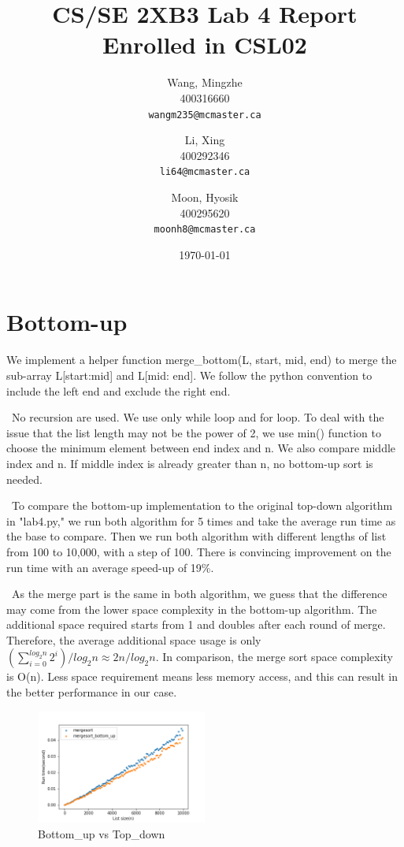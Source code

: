 \documentclass[12pt]{article}
\title{CS/SE 2XB3 Lab 4 Report\\Enrolled in CSL02}
\author{
  Wang, Mingzhe\\400316660\\
  \texttt{wangm235@mcmaster.ca}
  \and
  Li, Xing\\400292346\\
  \texttt{li64@mcmaster.ca}
  \and
  Moon, Hyosik\\400295620\\
  \texttt{moonh8@mcmaster.ca}
  }
\date{\today}
\begin{document}
\maketitle

\tableofcontents


\section{Bottom-up}
We implement a helper function merge\_bottom(L, start, mid, end) to merge the sub-array L[start:mid] and L[mid: end]. We follow the python convention to include the left end and exclude the right end.

~\newline\noindent No recursion are used. We use only while loop and for loop. To deal with the issue that the list length may not be the power of 2, we use min() function to choose the minimum element between end index and n. We also compare middle index and n. If middle index is already greater than n, no bottom-up sort is needed.

~\newline\noindent To compare the bottom-up implementation to the original top-down algorithm in "lab4.py," we run both algorithm for 5 times and take the average run time as the base to compare. Then we run both algorithm with different lengths of list from 100 to 10,000, with a step of 100. There is convincing improvement on the run time with an average speed-up of 19\%.

~\newline\noindent As the merge part is the same in both algorithm, we guess that the difference may come from the lower space complexity in the bottom-up algorithm. The additional space required starts from 1 and doubles after each round of merge. Therefore, the average additional space usage is only $(\sum_{i=0}^{log_2 n} 2^i)/log_2 n \approx 2n/log_2 n$. In comparison, the merge sort space complexity is O(n). Less space requirement means less memory access, and this can result in the better performance in our case.

\begin{figure}[hbt!]
    \centering
    \includegraphics[width=0.5\textwidth]{Figures/mergesort_vs_mergesort_bottom_up.png}
    \caption{Bottom\_up vs Top\_down}
     \label{Figure: bottom_up}
\end{figure}
\end{document}
